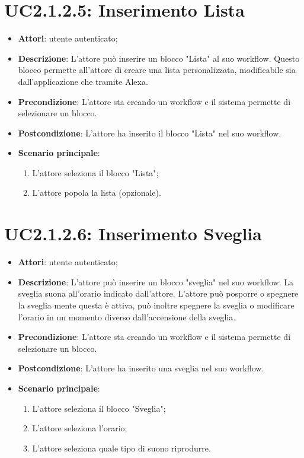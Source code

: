 \section{UC2.1.2.5: Inserimento Lista}
\label{UC2.1.2.5}
\begin{itemize}
	\item \textbf{Attori}: utente autenticato;
	\item \textbf{Descrizione}: L'attore può inserire un blocco "Lista" al suo workflow. Questo blocco permette all'attore di creare una lista personalizzata, modificabile sia dall'applicazione che tramite Alexa.
	\item \textbf{Precondizione}: L'attore sta creando un workflow e il sistema permette di selezionare un blocco.
	\item \textbf{Postcondizione}: L'attore ha inserito il blocco "Lista" nel suo workflow.
	\item \textbf{Scenario principale}:
	\begin{enumerate} \item L'attore seleziona il blocco "Lista";  \item  L'attore popola la lista (opzionale).\end{enumerate}
\end{itemize}

\section{UC2.1.2.6: Inserimento Sveglia}
\label{UC2.1.2.6}
\begin{itemize}
	\item \textbf{Attori}: utente autenticato;
	\item \textbf{Descrizione}: L'attore può inserire un blocco "sveglia" nel suo workflow. La sveglia suona all'orario indicato dall'attore. L'attore può posporre o spegnere la sveglia mente questa è attiva, può inoltre spegnere la sveglia o modificare l'orario in un momento diverso dall'accensione della sveglia.
	\item \textbf{Precondizione}: L'attore sta creando un workflow e il sistema permette di selezionare un blocco.
	\item \textbf{Postcondizione}: L'attore ha inserito una sveglia nel suo workflow.
	\item \textbf{Scenario principale}:
	\begin{enumerate} \item L'attore seleziona il blocco "Sveglia";  \item  L'attore seleziona l'orario;  \item  L'attore seleziona quale tipo di suono riprodurre.\end{enumerate}
\end{itemize}

